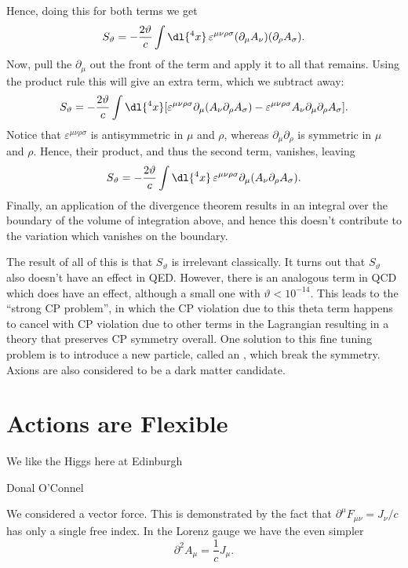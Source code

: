 \documentclass[fleqn]{NotesClass}
\newcommand*{\dalembertian}{\partial^2}
\begin{document}
    Hence, doing this for both terms we get
    \begin{equation}
        S_{\vartheta} = -\frac{2\vartheta}{c} \int \dl{^4x} \, \varepsilon^{\mu\nu\rho\sigma} (\partial_\mu A_\nu)(\partial_\rho A_\sigma).
    \end{equation}
    Now, pull the \(\partial_\mu\) out the front of the term and apply it to all that remains.
    Using the product rule this will give an extra term, which we subtract away:
    \begin{equation}
        S_{\vartheta} = -\frac{2\vartheta}{c} \int \dl{^4x} [\varepsilon^{\mu\nu\rho\sigma} \partial_\mu(A_\nu \partial_\rho A_\sigma) - \varepsilon^{\mu\nu\rho\sigma}A_\nu \partial_\mu\partial_\rho A_\sigma].
    \end{equation}
    Notice that \(\varepsilon^{\mu\nu\rho\sigma}\) is antisymmetric in \(\mu\) and \(\rho\), whereas \(\partial_\mu\partial_\rho\) is symmetric in \(\mu\) and \(\rho\).
    Hence, their product, and thus the second term, vanishes, leaving
    \begin{equation}
        S_{\vartheta} = -\frac{2\vartheta}{c} \int \dl{^4x} \, \varepsilon^{\mu\nu\rho\sigma} \partial_\mu (A_\nu \partial_\rho A_\sigma).
    \end{equation}
    Finally, an application of the divergence theorem results in an integral over the boundary of the volume of integration above, and hence this doesn't contribute to the variation which vanishes on the boundary.
    
    The result of all of this is that \(S_{\vartheta}\) is irrelevant classically.
    It turns out that \(S_{\vartheta}\) also doesn't have an effect in QED.
    However, there is an analogous term in QCD which does have an effect, although a small one with \(\vartheta < 10^{-14}\).
    This leads to the \enquote{strong CP problem}, in which the CP violation due to this theta term happens to cancel with CP violation due to other terms in the Lagrangian resulting in a theory that preserves CP symmetry overall.
    One solution to this fine tuning problem is to introduce a new particle, called an , which break the symmetry.
    Axions are also considered to be a dark matter candidate.
    
    \section{Actions are Flexible}
    \epigraph{We like the Higgs here at Edinburgh}{Donal O'Connel}
    We considered a vector force.
    This is demonstrated by the fact that \(\partial^\mu F_{\mu\nu} = J_\nu/c\) has only a single free index.
    In the Lorenz gauge we have the even simpler
    \begin{equation}
        \dalembertian A_\mu = \frac{1}{c}J_\mu.
    \end{equation}
    
\end{document}

